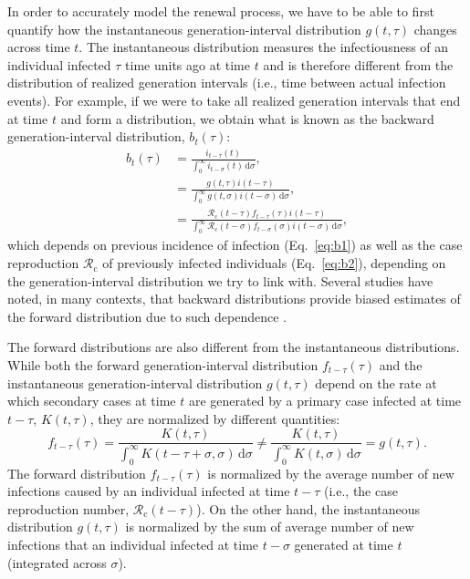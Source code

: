 \documentclass[12pt]{article}
\newcommand{\eref}[1]{Eq.~\ref{eq:#1}}
\newcommand{\Rx}[1]{\ensuremath{{\mathcal R}_{#1}}\xspace}
\newcommand{\Rc}{\Rx{\mathrm{c}}}
\newcommand{\dd}[1]{\ensuremath{\, \mathrm{d}#1}}
\newcommand{\dsigma}{\dd{\sigma}}
\begin{document}
In order to accurately model the renewal process, we have to be able to first quantify how the instantaneous generation-interval distribution $g(t, \tau)$ changes across time $t$.
The instantaneous distribution measures the infectiousness of an individual infected $\tau$ time units ago at time $t$ and is therefore different from the distribution of realized generation intervals (i.e., time between actual infection events).
For example, if we were to take all realized generation intervals that end at time $t$ and form a distribution, we obtain what is known as the backward generation-interval distribution, $b_t(\tau)$:
\begin{align}
b_t(\tau) &= \frac{i_{t-\tau}(t)}{\int_0^\infty i_{t-\sigma}(t) \dsigma},\label{eq:backward}\\
&= \frac{g(t,\tau) i(t-\tau)}{\int_0^\infty g(t,\sigma) i(t-\sigma) \dsigma},\label{eq:b1}\\
&= \frac{\Rc(t-\tau) f_{t-\tau}(\tau) i(t-\tau)}{\int_0^\infty \Rc(t-\sigma) f_{t-\sigma}(\sigma) i(t-\sigma) \dsigma},\label{eq:b2}
\end{align}
which depends on previous incidence of infection (\eref{b1}) as well as the case reproduction $\Rc$ of previously infected individuals (\eref{b2}), depending on the generation-interval distribution we try to link with.
Several studies have noted, in many contexts, that backward distributions provide biased estimates of the forward distribution due to such dependence \citep{nishiura2010time,champredon2015intrinsic,park2020inferring,park2020forward}.

The forward distributions are also different from the instantaneous distributions.
While both the forward generation-interval distribution $f_{t-\tau}(\tau)$ and the instantaneous generation-interval distribution $g(t, \tau)$ depend on the rate at which secondary cases at time $t$ are generated by a primary case infected at time $t-\tau$, $K(t, \tau)$, they are normalized by different quantities:
\begin{equation}
f_{t-\tau}(\tau) = \frac{K(t,\tau)}{\int_0^\infty K(t-\tau+\sigma,\sigma) \dsigma} \neq \frac{K(t,\tau)}{\int_0^\infty K(t,\sigma) \dsigma} = g(t, \tau).
\end{equation}
The forward distribution $f_{t-\tau}(\tau)$ is normalized by the average number of new infections caused by an individual infected at time $t-\tau$ (i.e., the case reproduction number, $\Rc(t-\tau)$).
On the other hand, the instantaneous distribution $g(t, \tau)$ is normalized by the sum of average number of new infections that an individual infected at time $t-\sigma$ generated at time $t$ (integrated across $\sigma$).
\end{document}
